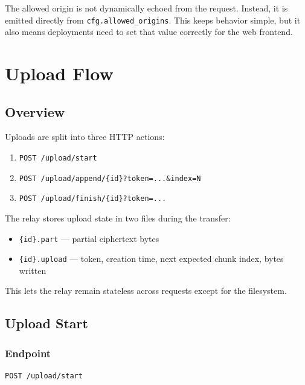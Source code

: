 \documentclass[11pt,a4paper]{report}
\begin{document}
The allowed origin is not dynamically echoed from the request. Instead, it is emitted directly from \texttt{cfg.allowed\_origins}. This keeps behavior simple, but it also means deployments need to set that value correctly for the web frontend.

\chapter{Upload Flow}

\section{Overview}

Uploads are split into three HTTP actions:

\begin{enumerate}
    \item \texttt{POST /upload/start}
    \item \texttt{POST /upload/append/\{id\}?token=...\&index=N}
    \item \texttt{POST /upload/finish/\{id\}?token=...}
\end{enumerate}

The relay stores upload state in two files during the transfer:

\begin{itemize}[leftmargin=1.5cm]
    \item \texttt{\{id\}.part} --- partial ciphertext bytes
    \item \texttt{\{id\}.upload} --- token, creation time, next expected chunk index, bytes written
\end{itemize}

This lets the relay remain stateless across requests except for the filesystem.

\section{Upload Start}

\subsection{Endpoint}

\begin{lstlisting}[language=bash]
POST /upload/start
\end{lstlisting}
\end{document}

